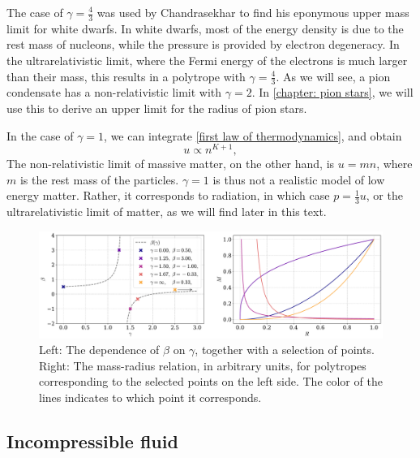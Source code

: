 The case of $\gamma = \frac{4}{3}$ was used by Chandrasekhar to find his eponymous upper mass limit for white dwarfs.
In white dwarfs, most of the energy density is due to the rest mass of nucleons, while the pressure is provided by electron degeneracy.
In the ultrarelativistic limit, where the Fermi energy of the electrons is much larger than their mass, this results in a polytrope with $\gamma = \frac{4}{3}$.
As we will see, a pion condensate has a non-relativistic limit with $\gamma = 2$.
In \autoref{chapter: pion stars}, we will use this to derive an upper limit for the radius of pion stars.

In the case of $\gamma = 1$, we can integrate \autoref{first law of thermodynamics}, and obtain
%
\begin{equation}
    u \propto n^{K + 1},
\end{equation}
%
The non-relativistic limit of massive matter, on the other hand, is $u = m n$, where $m$ is the rest mass of the particles.
$\gamma = 1$ is thus not a realistic model of low energy matter.
Rather, it corresponds to radiation, in which case $p = \frac{1}{3} u$, or the ultrarelativistic limit of matter, as we will find later in this text.


\begin{figure}[h]
    \centering
    \includegraphics[width=\textwidth]{../scripts/figurer/mass_radius_relation_polytropes.pdf}
    \caption{
        Left: The dependence of $\beta$ on $\gamma$, together with a selection of points.
        Right: The mass-radius relation, in arbitrary units, for polytropes corresponding to the selected points on the left side. The color of the lines indicates to which point it corresponds.
        }
    \label{fig: mass radius relation polytropes} 
\end{figure}



\subsection{Incompressible fluid}
\label{subsection: incompressible fluid}

